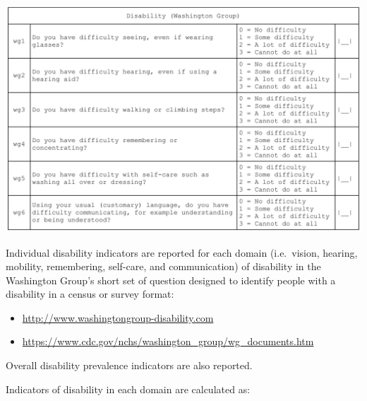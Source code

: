 \documentclass[12pt,a4paper]{book}
\theoremstyle{definition}
\theoremstyle{definition}
\theoremstyle{definition}
\theoremstyle{remark}
\begin{document}
\begin{center}\includegraphics{figures/questionnaire04} \end{center}

\newpage

Individual disability indicators are reported for each domain
(i.e.~vision, hearing, mobility, remembering, self-care, and
communication) of disability in the Washington Group's short set of
question designed to identify people with a disability in a census or
survey format:

\begin{itemize}
\item
  \url{http://www.washingtongroup-disability.com}
\item
  \url{https://www.cdc.gov/nchs/washington_group/wg_documents.htm}
\end{itemize}

Overall disability prevalence indicators are also reported.

Indicators of disability in each domain are calculated as:
\end{document}

